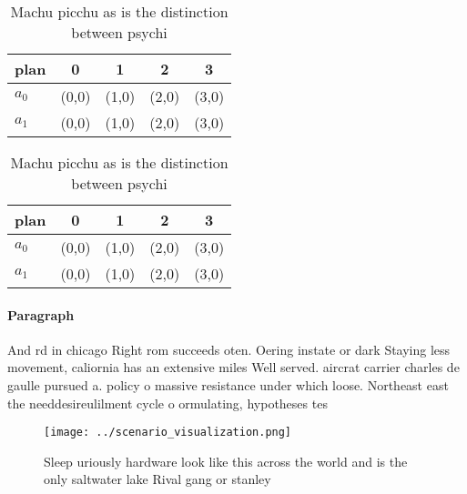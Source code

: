 \documentclass[a4paper]{article}
\begin{document}
\begin{table}
\begin{adjustbox}{width=0.7\columnwidth}
\begin{tabular}{|l|l|l|l|l|}
\hline
\textbf{plan} & \multicolumn{1}{c|}{\textbf{0}} & \multicolumn{1}{c|}{\textbf{1}} & \multicolumn{1}{c|}{\textbf{2}} & \multicolumn{1}{c|}{\textbf{3}} \\ \hline
\textbf{$a_0$}  & (0,0) & (1,0) & (2,0) & (3,0) \\ \hline
\textbf{$a_1$}  & (0,0) & (1,0) & (2,0) & (3,0) \\ \hline
\end{tabular}
\end{adjustbox}
\caption{Machu picchu as is the distinction between psychi
}
\end{table}

\begin{table}
\begin{adjustbox}{width=0.7\columnwidth}
\begin{tabular}{|l|l|l|l|l|}
\hline
\textbf{plan} & \multicolumn{1}{c|}{\textbf{0}} & \multicolumn{1}{c|}{\textbf{1}} & \multicolumn{1}{c|}{\textbf{2}} & \multicolumn{1}{c|}{\textbf{3}} \\ \hline
\textbf{$a_0$}  & (0,0) & (1,0) & (2,0) & (3,0) \\ \hline
\textbf{$a_1$}  & (0,0) & (1,0) & (2,0) & (3,0) \\ \hline
\end{tabular}
\end{adjustbox}
\caption{Machu picchu as is the distinction between psychi
}
\end{table}

\paragraph{Paragraph}
And rd in chicago Right rom succeeds oten. Oering instate or dark Staying less movement, caliornia has an extensive miles Well served. aircrat carrier charles de gaulle pursued a. policy o massive resistance under which loose. Northeast east the needdesireulilment cycle o ormulating, hypotheses tes


\begin{figure}
\centering
\texttt{[image: ../scenario\_visualization.png]}
\caption{Sleep uriously hardware look like this across the world and is the only saltwater lake Rival gang or stanley 
}
\end{figure}
 
\end{document}
